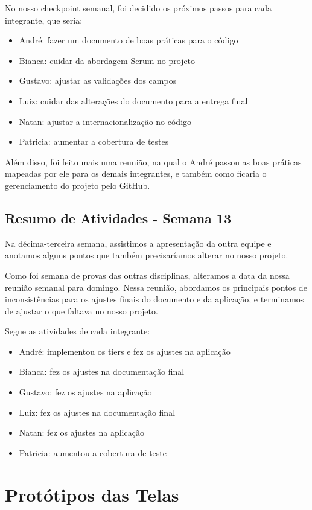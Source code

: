 \begin{apendicesenv}
No nosso checkpoint semanal, foi decidido os próximos passos para cada integrante, que seria:

\begin{itemize}
\item André: fazer um documento de boas práticas para o código
\item Bianca: cuidar da abordagem Scrum no projeto
\item Gustavo: ajustar as validações dos campos
\item Luiz: cuidar das alterações do documento para a entrega final
\item Natan: ajustar a internacionalização no código
\item Patricia: aumentar a cobertura de testes
\end{itemize}

Além disso, foi feito mais uma reunião, na qual o André passou as boas práticas mapeadas por ele para os demais integrantes, e também como ficaria o gerenciamento do projeto pelo GitHub.


\section{Resumo de Atividades - Semana 13}
Na décima-terceira semana, assistimos a apresentação da outra equipe e anotamos alguns pontos que também precisaríamos alterar no nosso projeto.

Como foi semana de provas das outras disciplinas, alteramos a data da nossa reunião semanal para domingo. Nessa reunião, abordamos os principais pontos de inconsistências para os ajustes finais do documento e da aplicação, e terminamos de ajustar o que faltava no nosso projeto.

Segue as atividades de cada integrante:

\begin{itemize}
\item André: implementou os tiers e fez os ajustes na aplicação
\item Bianca: fez os ajustes na documentação final
\item Gustavo: fez os ajustes na aplicação
\item Luiz: fez os ajustes na documentação final
\item Natan: fez os ajustes na aplicação
\item Patricia: aumentou a cobertura de teste
\end{itemize}
\chapter{Protótipos das Telas}
\label{prototipos}


\end{apendicesenv}
